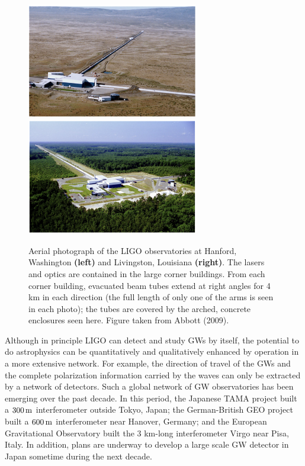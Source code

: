 \documentclass[a4paper,10pt]{article}
\begin{document}
\begin{figure}[t]
    \centering
    \includegraphics[width=7.5cm]{figures/LIGO_Washington.png}
    \includegraphics[width=7.5cm]{figures/LIGO_Louisiana.png}
    \caption{\footnotesize{Aerial photograph of the LIGO observatories at Hanford, Washington \textbf{(left)} and Livingston, Louisiana \textbf{(right)}. The lasers and optics are contained in the large corner buildings. From each corner building, evacuated beam tubes extend at right angles for 4 km in each direction (the full length of only one of the arms is seen in each photo); the tubes are covered by the arched, concrete enclosures seen here. Figure taken from Abbott (2009).}}
    \label{fig:ligo}
\end{figure}

{\noindent}Although in principle LIGO can detect and study GWs by itself, the potential to do astrophysics can be quantitatively and qualitatively enhanced by operation in a more extensive network. For example, the direction of travel of the GWs and the complete polarization information carried by the waves can only be extracted by a network of detectors. Such a global network of GW observatories has been emerging over the past decade. In this period, the Japanese TAMA project built a $300\,{\rm m}$ interferometer outside Tokyo, Japan; the German-British GEO project built a $600\,{\rm m}$ interferometer near Hanover, Germany; and the European Gravitational Observatory built the 3 km-long interferometer Virgo near Pisa, Italy. In addition, plans are underway to develop a large scale GW
detector in Japan sometime during the next decade.
\end{document}
